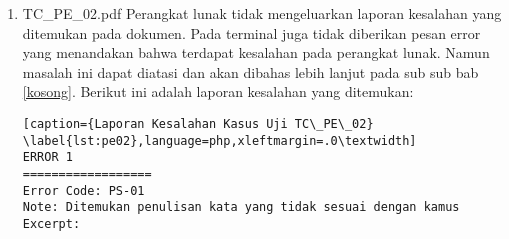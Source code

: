 \begin{enumerate}
\begin{lstlisting}[caption={Laporan Kesalahan Kasus Uji TC\_PE\_01}	\label{lst:pe01},language=php,xleftmargin=.0\textwidth]
ERROR 10
==================
Error Code: NAT-01
Note: Referensi tidak dirujuk dengan baik, lakukan perintah PDFLatex->BibTex->
PDFLatex->PDFLatex untuk memperbaikinya
Excerpt: 2.1Pengelompokan 2.1.1Definisi Pengelompokan Pengelompokan ( 
clustering ) merupakan sebuah metode untuk menggabungkan himpunan objek ke 
dalam kelompok-kelompok sedemikian rupa sehingga objek dalam satu kelompok 
( cluster ) lebih mirip (karena suatu hal) satu sama lain daripada objek di 
kelompok lain [ ?]
\end{lstlisting}
	
	\item TC\_PE\_02.pdf \newline
	Perangkat lunak tidak mengeluarkan laporan kesalahan yang ditemukan pada dokumen. Pada terminal juga tidak diberikan pesan error yang menandakan bahwa terdapat kesalahan pada perangkat lunak. Namun masalah ini dapat diatasi dan akan dibahas lebih lanjut pada sub sub bab \ref{kosong}. Berikut ini adalah laporan kesalahan yang ditemukan:

\begin{lstlisting}[caption={Laporan Kesalahan Kasus Uji TC\_PE\_02}	\label{lst:pe02},language=php,xleftmargin=.0\textwidth]
ERROR 1
==================
Error Code: PS-01
Note: Ditemukan penulisan kata yang tidak sesuai dengan kamus
Excerpt: 


\end{lstlisting}
\end{enumerate}
